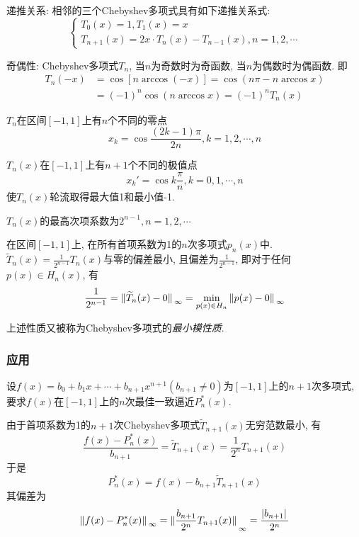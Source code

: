 递推关系: 相邻的三个Chebyshev多项式具有如下递推关系式:
\begin{equation*}
    \begin{cases}
        T_0(x)=1, T_1(x)=x\\
        T_{n+1}(x)=2x\cdot T_n(x)-T_{n-1}(x), n=1,2,\cdots
    \end{cases}
\end{equation*}

奇偶性: Chebyshev多项式$T_n$, 当$n$为奇数时为奇函数, 当$n$为偶数时为偶函数. 即
\begin{align*}
    T_n(-x)&=\cos[n\arccos(-x)]=\cos(n\pi-n\arccos{x})\\
    &=(-1)^n\cos(n\arccos{x})=(-1)^nT_n(x)
\end{align*}

$T_n$在区间$[-1,1]$上有$n$个不同的零点
\begin{equation*}
    x_k=\cos{\frac{(2k-1)\pi}{2n}}, k=1,2,\cdots,n
\end{equation*}

$T_n(x)$在$[-1,1]$上有$n+1$个不同的极值点
\begin{equation*}
    x_k'=\cos{k\frac{\pi}{n}}, k=0,1,\cdots,n
\end{equation*}
使$T_n(x)$轮流取得最大值1和最小值-1.

$T_n(x)$的最高次项系数为$2^{n-1}, n=1,2,\cdots$

在区间$[-1,1]$上, 在所有首项系数为1的$n$次多项式$p_n(x)$中. $\widetilde{T}_n(x)=\frac{1}{2^{n-1}}T_n(x)$与零的偏差最小, 且偏差为$\frac{1}{2^{n-1}}$, 即对于任何$p(x)\in H_n(x)$, 有
\begin{equation*}
    \frac{1}{2^{n-1}}=\norm*{\widetilde{T}_n(x)-0}_\infty=\min_{p(x)\in H_n}\norm*{p(x)-0}_\infty
\end{equation*}

上述性质又被称为Chebyshev多项式的\emph{最小模性质}.

\subsubsection{应用}

设$f(x)=b_0+b_1x+\cdots+b_{n+1}x^{n+1}(b_{n+1}\ne0)$为$[-1,1]$上的$n+1$次多项式, 要求$f(x)$在$[-1,1]$上的$n$次最佳一致逼近$P_n^*(x)$.

由于首项系数为1的$n+1$次Chebyshev多项式$\widetilde{T}_{n+1}(x)$无穷范数最小, 有
\begin{equation*}
    \frac{f(x)-P_n^*(x)}{b_{n+1}}=\widetilde{T}_{n+1}(x)=\frac{1}{2^n}T_{n+1}(x)
\end{equation*}
于是
\begin{equation*}
    P_n^*(x)=f(x)-b_{n+1}\widetilde{T}_{n+1}(x)
\end{equation*}
其偏差为
\begin{equation*}
    \norm*{f(x)-P_n^*(x)}_\infty=\norm*{\frac{b_{n+1}}{2^n}T_{n+1}(x)}_\infty=\frac{\abs*{b_{n+1}}}{2^n}
\end{equation*}

